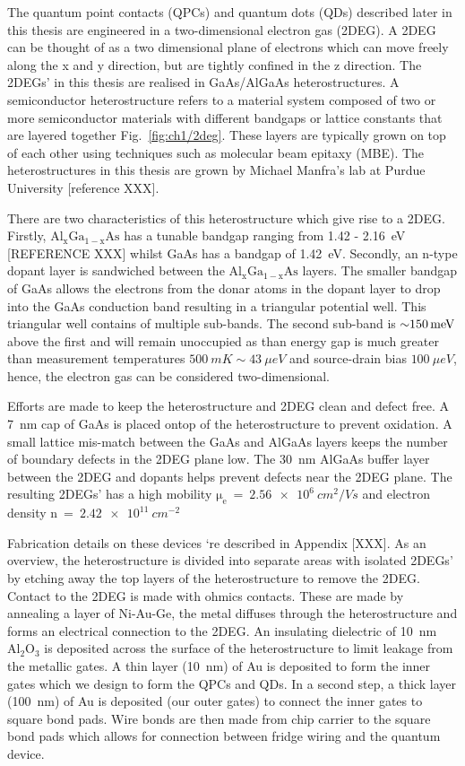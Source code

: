 The quantum point contacts (QPCs) and quantum dots (QDs) described later in this thesis are engineered in a two-dimensional electron gas (2DEG). A 2DEG can be thought of as a two dimensional plane of electrons which can move freely along the x and y direction, but are tightly confined in the z direction. The 2DEGs' in this thesis are realised in GaAs/AlGaAs heterostructures. A semiconductor heterostructure refers to a material system composed of two or more semiconductor materials with different bandgaps or lattice constants that are layered together Fig.~\ref{fig:ch1/2deg}. These layers are typically grown on top of each other using techniques such as molecular beam epitaxy (MBE). The heterostructures in this thesis are grown by Michael Manfra's lab at Purdue University [reference XXX]. 

There are two characteristics of this heterostructure which give rise to a 2DEG. Firstly, $\mathrm{Al_xGa_{1-x}As}$ has a tunable bandgap ranging from 1.42 - \qty{2.16}{eV} [REFERENCE XXX] whilst GaAs has a bandgap of \qty{1.42}{eV}. Secondly, an n-type dopant layer is sandwiched between the $\mathrm{Al_xGa_{1-x}As}$ layers. The smaller bandgap of GaAs allows the electrons from the donar atoms in the dopant layer to drop into the GaAs conduction band resulting in a triangular potential well. This triangular well contains of multiple sub-bands. The second sub-band is $\qty{\sim 150}{meV}$ above the first and will remain unoccupied as than energy gap is much greater than measurement temperatures $\qty{500}{mK}\sim\qty{43}{\mu eV}$ and source-drain bias $\qty{100}{\mu eV}$, hence, the electron gas can be considered two-dimensional.

Efforts are made to keep the heterostructure and 2DEG clean and defect free. A \qty{7}{nm} cap of GaAs is placed ontop of the heterostructure to prevent oxidation. A small lattice mis-match between the GaAs and AlGaAs layers keeps the number of boundary defects in the 2DEG plane low. The \qty{30}{nm} AlGaAs buffer layer between the 2DEG and dopants helps prevent defects near the 2DEG plane. The resulting 2DEGs' has a high mobility $\mathrm{\mu_e}~=~\qty{2.56e6}{cm^2/Vs}$ and electron density $\mathrm{n}~=~\qty{2.42e11}{cm^{-2}}$

Fabrication details on these devices `re described in Appendix [XXX]. As an overview, the heterostructure is divided into separate areas with isolated 2DEGs' by etching away the top layers of the heterostructure to remove the 2DEG. Contact to the 2DEG is made with ohmics contacts. These are made by annealing a layer of Ni-Au-Ge, the metal diffuses through the heterostructure and forms an electrical connection to the 2DEG. An insulating dielectric of \qty{10}{nm} $\mathrm{Al_2O_3}$ is deposited across the surface of the heterostructure to limit leakage from the metallic gates.  A thin layer (\qty{10}{nm}) of Au is deposited to form the inner gates which we design to form the QPCs and QDs. In a second step, a thick layer (\qty{100}{nm}) of Au is deposited (our outer gates) to connect the inner gates to square bond pads. Wire bonds are then made from chip carrier to the square bond pads which allows for connection between fridge wiring and the quantum device. 




